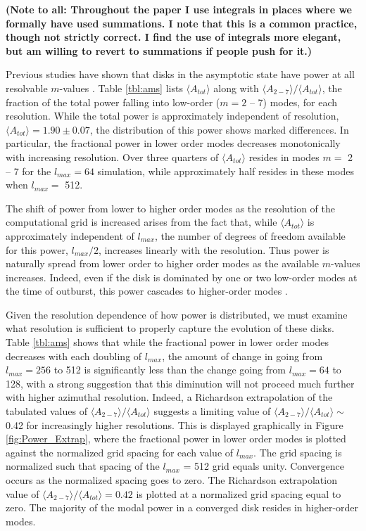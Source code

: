 \documentclass[manuscript]{aastex} %
\begin{document}
{\bf (Note to all: Throughout the paper I use integrals in places where we 
formally have used summations.  I note that this is a common practice, though
not strictly correct.  I find the use of integrals more elegant, but am willing to
revert to summations if people push for it.)}

Previous studies have shown that disks in the asymptotic state have power at all resolvable $m$-values  \citep{lodato2004,mejia2005,boley2006,cossins2009}.  Table \ref{tbl:ams} lists $\langle A_{tot} \rangle$ along with $\langle A_{2-7} \rangle  /  \langle A_{tot} \rangle$,  the fraction of the total power falling into low-order ($m = 2$ -- 7) modes, for each resolution. While the total power is approximately independent of resolution, $\langle A_{tot} \rangle = 1.90 \pm 0.07$, 
the distribution of this power shows marked differences. In particular, the fractional power in lower order modes decreases monotonically with increasing resolution.  Over three quarters of $\langle A_{tot} \rangle$ resides
in modes $m =$ 2 -- 7 for the $l_{max} = 64$ simulation, while approximately half resides in these modes when $l_{max} =$ 512.

The shift of power from lower to higher order modes as the resolution of the computational grid is increased arises from the fact that, while $\langle A_{tot} \rangle$ is approximately independent of $l_{max}$,  the number of degrees of freedom available for this power, $l_{max}/2$, increases linearly with the resolution. Thus power is naturally spread from lower order to higher order modes as the available $m$-values increases. Indeed, even if the disk is dominated by one or two low-order modes at the time of outburst, this power cascades to higher-order modes \citep[for example][]{laughlin1997, laughlin1998,laughlin1996}.


Given the resolution dependence of how power is distributed,  we must examine what resolution is sufficient to properly capture the evolution of these disks. Table \ref{tbl:ams} shows that while the fractional power in lower order modes decreases with each doubling of $l_{max}$, the amount of change in going from $l_{max} = 256$ to 512 
is significantly less than the change going from $l_{max} = 64$ to 128, with a strong suggestion that this diminution will not proceed much further with higher azimuthal resolution. Indeed, a  Richardson extrapolation \citep{press1992} of the tabulated values of  $\langle A_{2-7} \rangle / \langle A_{tot} \rangle$ suggests a limiting value of  $\langle A_{2-7} \rangle / \langle A_{tot} \rangle \sim$ 0.42 for increasingly higher resolutions. This is displayed graphically in Figure \ref{fig:Power_Extrap}, where the fractional power in lower order modes is plotted against the  normalized grid 
spacing for each value of $l_{max}$. The grid spacing  is normalized such that spacing of the $l_{max}$ = 512 grid
equals unity.  Convergence occurs as the normalized spacing goes to zero. The Richardson extrapolation value  of $\langle A_{2-7}\rangle  / \langle A_{tot}\rangle  = 0.42$ is plotted at a normalized grid spacing  equal to zero. The majority of the modal power in a converged disk resides in higher-order modes. 
\end{document}
